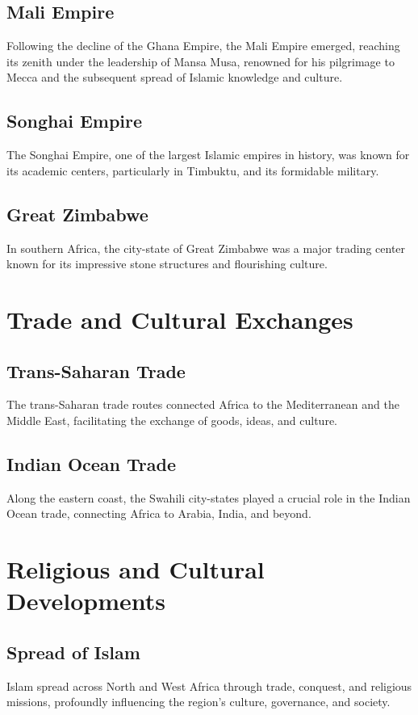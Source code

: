 \documentclass{book}
\begin{document}
\subsection{Mali Empire}
Following the decline of the Ghana Empire, the Mali Empire emerged, reaching its zenith under the leadership of Mansa Musa, renowned for his pilgrimage to Mecca and the subsequent spread of Islamic knowledge and culture.

\subsection{Songhai Empire}
The Songhai Empire, one of the largest Islamic empires in history, was known for its academic centers, particularly in Timbuktu, and its formidable military.

\subsection{Great Zimbabwe}
In southern Africa, the city-state of Great Zimbabwe was a major trading center known for its impressive stone structures and flourishing culture.

\section{Trade and Cultural Exchanges}
\label{sec:trade-cultural-exchanges}

\subsection{Trans-Saharan Trade}
The trans-Saharan trade routes connected Africa to the Mediterranean and the Middle East, facilitating the exchange of goods, ideas, and culture.

\subsection{Indian Ocean Trade}
Along the eastern coast, the Swahili city-states played a crucial role in the Indian Ocean trade, connecting Africa to Arabia, India, and beyond.

\section{Religious and Cultural Developments}
\label{sec:religious-cultural-developments}

\subsection{Spread of Islam}
Islam spread across North and West Africa through trade, conquest, and religious missions, profoundly influencing the region’s culture, governance, and society.
\end{document}
